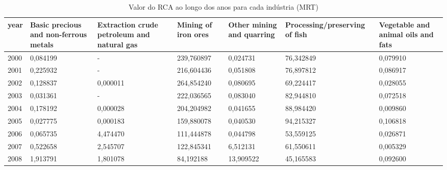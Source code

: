 \begin{table}
\centering
\caption{Valor do RCA ao longo dos anos para cada indústria (MRT)}
\begin{tabular}{p{1cm}p{2cm}p{2cm}p{2cm}p{2cm}p{2cm}p{2cm}}
\toprule
 year &  Basic precious and non-ferrous metals &  Extraction crude petroleum and natural gas &  Mining of iron ores &  Other mining and quarring &  Processing/preserving of fish &  Vegetable and animal oils and fats \\
\midrule
 2000 &                               0,084199 &                                           - &           239,760897 &                   0,024731 &                      76,342849 &                            0,079910 \\
 2001 &                               0,225932 &                                           - &           216,604436 &                   0,051808 &                      76,897812 &                            0,086917 \\
 2002 &                               0,128837 &                                    0,000011 &           264,854240 &                   0,080695 &                      69,224417 &                            0,028055 \\
 2003 &                               0,031361 &                                           - &           222,036565 &                   0,083040 &                      82,944810 &                            0,072518 \\
 2004 &                               0,178192 &                                    0,000028 &           204,204982 &                   0,041655 &                      88,984420 &                            0,009860 \\
 2005 &                               0,027775 &                                    0,000183 &           159,880078 &                   0,040530 &                      94,215327 &                            0,106818 \\
 2006 &                               0,065735 &                                    4,474470 &           111,444878 &                   0,044798 &                      53,559125 &                            0,026871 \\
 2007 &                               0,522658 &                                    2,545707 &           122,845341 &                   6,512131 &                      61,550611 &                            0,005329 \\
 2008 &                               1,913791 &                                    1,801078 &            84,192188 &                  13,909522 &                      45,165583 &                            0,092600 \\

\end{tabular}
\end{table}
